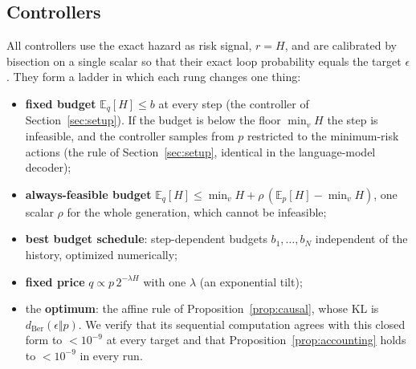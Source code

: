 \documentclass[make,article,submit,pdftex]{Definitions/mdpi}
\providecommand{\E}{}\renewcommand{\E}{\mathbb{E}}
\begin{document}
\subsection{Controllers}
All controllers use the exact hazard as risk signal, $r=H$, and are calibrated by bisection on a single scalar so that their exact loop probability equals the target $\epsilon$. They form a ladder in which each rung changes one thing:
\begin{itemize}[leftmargin=*,itemsep=1pt]
\item \textbf{fixed budget} $\E_q[H]\le b$ at every step (the controller of Section~\ref{sec:setup}). If the budget is below the floor $\min_vH$ the step is infeasible, and the controller samples from $p$ restricted to the minimum-risk actions (the rule of Section~\ref{sec:setup}, identical in the language-model decoder);
\item \textbf{always-feasible budget} $\E_q[H]\le \min_v H+\rho\,(\E_p[H]-\min_v H)$, one scalar $\rho$ for the whole generation, which cannot be infeasible;
\item \textbf{best budget schedule}: step-dependent budgets $b_1,\dots,b_N$ independent of the history, optimized numerically;
\item \textbf{fixed price} $q\propto p\,2^{-\lambda H}$ with one $\lambda$ (an exponential tilt);
\item the \textbf{optimum}: the affine rule of Proposition~\ref{prop:causal}, whose KL is $d_{\mathrm{Ber}}(\epsilon\Vert p)$. We verify that its sequential computation agrees with this closed form to $<10^{-9}$ at every target and that Proposition~\ref{prop:accounting} holds to $<10^{-9}$ in every run.
\end{itemize}
\end{document}
